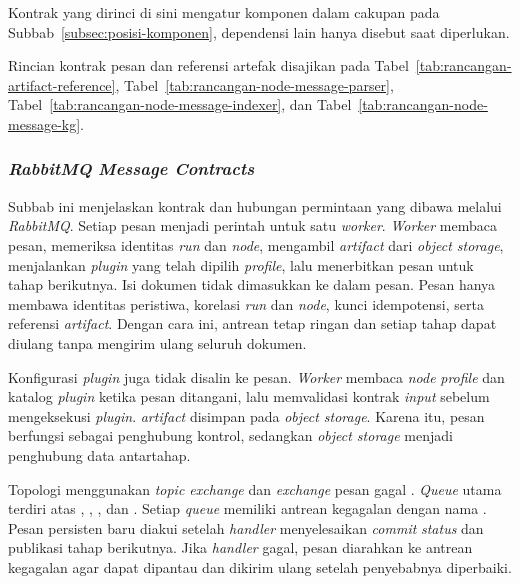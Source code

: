 Kontrak yang dirinci di sini mengatur komponen dalam cakupan pada
Subbab~\ref{subsec:posisi-komponen}, dependensi lain hanya disebut saat diperlukan.

\noindent Rincian kontrak pesan dan referensi artefak disajikan pada Tabel~\ref{tab:rancangan-artifact-reference},
Tabel~\ref{tab:rancangan-node-message-parser}, Tabel~\ref{tab:rancangan-node-message-indexer},
dan Tabel~\ref{tab:rancangan-node-message-kg}.

\subsubsection{\emph{RabbitMQ} \emph{Message Contracts}}
\label{subsubsec:rancangan-message-artifact}

Subbab ini menjelaskan kontrak dan hubungan permintaan yang dibawa melalui
\emph{RabbitMQ}. Setiap pesan menjadi perintah untuk satu \emph{worker}. \emph{Worker} membaca
pesan, memeriksa identitas \emph{run} dan \emph{node}, mengambil \emph{artifact} dari \emph{object storage},
menjalankan \emph{plugin} yang telah dipilih \emph{profile}, lalu menerbitkan pesan untuk
tahap berikutnya. Isi dokumen tidak dimasukkan ke dalam pesan. Pesan hanya
membawa identitas peristiwa, korelasi \emph{run} dan \emph{node}, kunci idempotensi, serta
referensi \emph{artifact}. Dengan cara ini, antrean tetap ringan dan setiap tahap dapat
diulang tanpa mengirim ulang seluruh dokumen.

Konfigurasi \emph{plugin} juga tidak disalin ke pesan. \emph{Worker} membaca \emph{node} \emph{profile} dan
katalog \emph{plugin} ketika pesan ditangani, lalu memvalidasi kontrak \emph{input} sebelum
mengeksekusi \emph{plugin}. \emph{artifact} disimpan pada \emph{object storage}. Karena itu, pesan
berfungsi sebagai penghubung kontrol, sedangkan \emph{object storage} menjadi
penghubung data antartahap.

Topologi menggunakan \emph{topic exchange}  dan
\emph{exchange} pesan gagal . \emph{Queue} utama terdiri atas
, ,
, dan . Setiap \emph{queue} memiliki
antrean kegagalan dengan nama . Pesan persisten
baru diakui setelah \emph{handler} menyelesaikan \emph{commit} \emph{status} dan publikasi tahap
berikutnya. Jika \emph{handler} gagal, pesan diarahkan ke antrean kegagalan agar dapat
dipantau dan dikirim ulang setelah penyebabnya diperbaiki.

